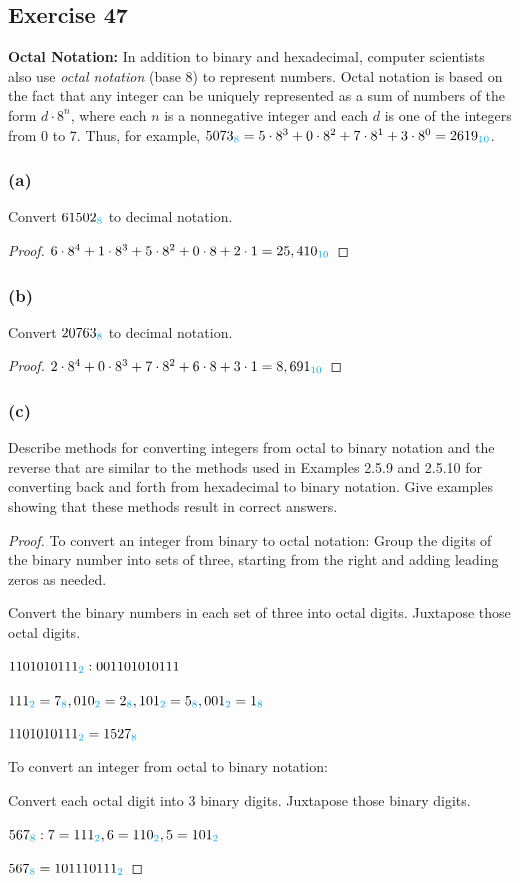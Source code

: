 \documentclass[14pt]{extarticle}
\newcommand{\base}[1]{{\color{cyan}#1}} \newcommand{\da}{\downarrow}
\begin{document}
\subsection{Exercise 47} {\bf Octal Notation:} In addition to binary and
hexadecimal, computer scientists also use {\it octal notation} (base 8) to
represent numbers. Octal notation is based on the fact that any integer can be
uniquely represented as a sum of numbers of the form $d \cdot 8^n$, where each
$n$ is a nonnegative integer and each $d$ is one of the integers from 0 to 7.
Thus, for example, $5073_\base{8} = 5 \cdot 8^3 + 0 \cdot 8^2 + 7 \cdot 8^1 + 3
\cdot 8^0 = 2619_\base{10}$.

\subsubsection{(a)} Convert $61502_\base{8}$ to decimal notation.
\begin{proof} $6\cdot8^4 + 1\cdot8^3 + 5\cdot8^2 + 0\cdot8 + 2\cdot1 =
25,410_\base{10}$ \end{proof}

\subsubsection{(b)} Convert $20763_\base{8}$ to decimal notation.
\begin{proof} $2\cdot8^4 + 0\cdot8^3 + 7\cdot8^2 + 6\cdot8 + 3\cdot1 =
8,691_\base{10}$ \end{proof}

\subsubsection{(c)} Describe methods for converting integers from octal to
binary notation and the reverse that are similar to the methods used in Examples
2.5.9 and 2.5.10 for converting back and forth from hexadecimal to binary
notation. Give examples showing that these methods result in correct answers.

\begin{proof} To convert an integer from binary to octal notation:
Group the digits of the binary number into sets of three, starting from the
right and adding leading zeros as needed.

Convert the binary numbers in each set of three into octal digits. Juxtapose
those octal digits.

$1101010111_\base{2}: 001 101 010 111$ 

$111_\base{2} = 7_\base{8}, 010_\base{2} = 2_\base{8}, 101_\base{2} =
5_\base{8}, 001_\base{2} = 1_\base{8}$

$1101010111_\base{2} = 1527_\base{8}$

To convert an integer from octal to binary notation:

Convert each octal digit into 3 binary digits. Juxtapose those binary digits.

$567_\base{8}:  7 = 111_\base{2}, 6 = 110_\base{2}, 5 = 101_\base{2}$

$567_\base{8} = 101110111_\base{2}$ \end{proof}
\end{document}

